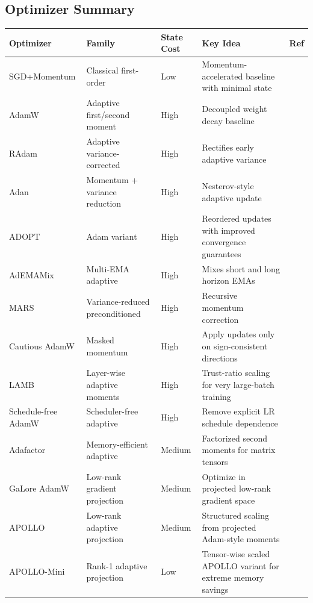 \subsection{Optimizer Summary}
\small
\begin{longtable}{p{2.2cm}p{2.8cm}p{2.0cm}p{5.4cm}p{1.8cm}}
\toprule
\textbf{Optimizer} & \textbf{Family} & \textbf{State Cost} & \textbf{Key Idea} & \textbf{Ref} \\
\midrule
\endhead
SGD+Momentum & Classical first-order & Low & Momentum-accelerated baseline with minimal state & \citep{polyak_1964} \\
AdamW & Adaptive first/second moment & High & Decoupled weight decay baseline & \citep{loshchilov_decoupled_2017} \\
RAdam & Adaptive variance-corrected & High & Rectifies early adaptive variance & \citep{liu_variance_2019} \\
Adan & Momentum + variance reduction & High & Nesterov-style adaptive update & \citep{xie_adan_2022} \\
ADOPT & Adam variant & High & Reordered updates with improved convergence guarantees & \citep{taniguchi_adopt_2024} \\
AdEMAMix & Multi-EMA adaptive & High & Mixes short and long horizon EMAs & \citep{pagliardini_ademamix_2024} \\
MARS & Variance-reduced preconditioned & High & Recursive momentum correction & \citep{yuan_mars_2024} \\
Cautious AdamW & Masked momentum & High & Apply updates only on sign-consistent directions & \citep{liang_cautious_2024} \\
LAMB & Layer-wise adaptive moments & High & Trust-ratio scaling for very large-batch training & \citep{you_largebatch_2020} \\
Schedule-free AdamW & Scheduler-free adaptive & High & Remove explicit LR schedule dependence & \citep{defazio_road_2024} \\
Adafactor & Memory-efficient adaptive & Medium & Factorized second moments for matrix tensors & \citep{shazeer_adafactor_2018} \\
GaLore AdamW & Low-rank gradient projection & Medium & Optimize in projected low-rank gradient space & \citep{zhao_galore_2024} \\
APOLLO & Low-rank adaptive projection & Medium & Structured scaling from projected Adam-style moments & \citep{zhu2025apollosgdlikememoryadamwlevel} \\
APOLLO-Mini & Rank-1 adaptive projection & Low & Tensor-wise scaled APOLLO variant for extreme memory savings & \citep{zhu2025apollosgdlikememoryadamwlevel} \\

\end{longtable}
